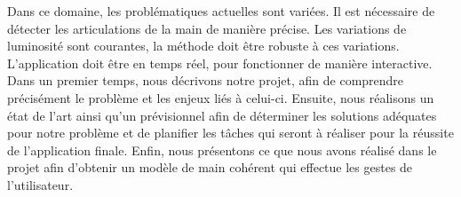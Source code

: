 Dans ce domaine, les problématiques actuelles sont variées. Il est 
nécessaire de détecter les articulations de la main de manière précise. 
Les variations de luminosité sont courantes, la méthode doit être robuste 
à ces variations. L'application doit être en temps réel, pour fonctionner de 
manière interactive.\\

Dans un premier temps, nous décrivons notre projet, afin de comprendre 
précisément le problème et les enjeux liés à celui-ci. Ensuite, nous 
réalisons un état de l'art ainsi qu'un prévisionnel afin de déterminer 
les solutions adéquates pour notre problème et de planifier les tâches 
qui seront à réaliser pour la réussite de l'application finale. 
Enfin, nous présentons ce que nous avons réalisé dans le projet afin
d'obtenir un modèle de main cohérent qui effectue les gestes de l'utilisateur.
